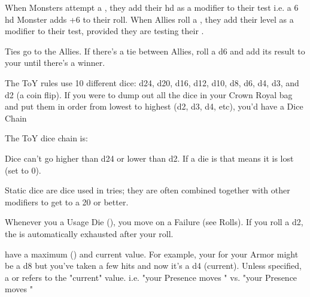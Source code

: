 {When Monsters attempt a \RB, they add their {hd} as a modifier to their test i.e. a 6 {hd} Monster adds +6 to their \RB roll.  When Allies roll a \RB, they add their level as a modifier to their test, provided they are testing their .

Ties go to the Allies.  If there's a tie between Allies, roll a d6 and add its result to your \RB until there's a winner.

\newpage

The ToY rules use 10 different dice: d24, d20, d16, d12, d10, d8, d6, d4, d3, and d2 (a coin flip).   If you were to dump out all the dice in your Crown Royal bag and put them in order from lowest to highest (d2, d3, d4, etc), you'd have a Dice Chain

The ToY dice chain is:
~\\


Dice can't go higher than d24 or lower than d2.  If a die is   that means it is lost (set to 0).


Static dice are dice used in \RO tries; they are often combined together with other modifiers to get to a 20 or better.


\cbreak


Whenever you \RS a Usage Die (\UD), you move \DCDOWN on a Failure (see Rolls).  If you roll a d2, the \UD is automatically exhausted after your roll.

\UD have a maximum (\MAX) and current value.  For example, your \UD for your Armor might be a d8 \MAX but you've taken a few hits and now it's a d4 (current).  Unless specified, a \DCDOWN or \DCUP refers to the "current" value.  i.e.  "your Presence moves \DCDOWN" vs. "your \MAX Presence moves \DCDOWN"

}
